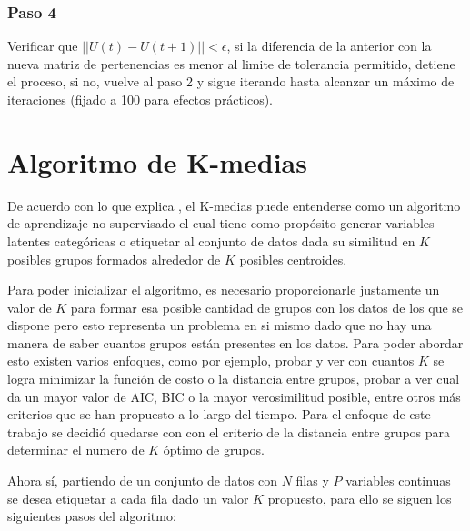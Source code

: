 \documentclass[11pt, letterpaper]{article}
\begin{document}
\subsubsection{Paso 4}

Verificar que $||U(t)-U(t+1)||<\epsilon$, si la diferencia de la anterior con la nueva matriz de pertenencias es menor al limite de tolerancia permitido, detiene el proceso, si no, vuelve al paso 2 y sigue iterando hasta alcanzar un máximo de iteraciones (fijado a 100 para efectos prácticos).

\newpage

\section{Algoritmo de K-medias}


De acuerdo con lo que explica \cite{bishop2006}, el K-medias puede entenderse como un algoritmo de aprendizaje no supervisado el cual tiene como propósito generar variables latentes categóricas o etiquetar al conjunto de datos dada su similitud en $K$ posibles grupos formados alrededor de $K$ posibles centroides.

Para poder inicializar el algoritmo, es necesario proporcionarle justamente un valor de $K$ para formar esa posible cantidad de grupos con los datos de los que se dispone pero esto representa un problema en si mismo dado que no hay una manera de saber cuantos grupos están presentes en los datos. Para poder abordar esto existen varios enfoques, como por ejemplo, probar y ver con cuantos $K$ se logra minimizar la función de costo o la distancia entre grupos, probar a ver cual da un mayor valor de AIC, BIC o la mayor verosimilitud posible, entre otros más criterios que se han propuesto a lo largo del tiempo. Para el enfoque de este trabajo se decidió quedarse con con el criterio de la distancia entre grupos para determinar el numero de $K$ óptimo de grupos.

Ahora sí, partiendo de un conjunto de datos con $N$ filas y $P$ variables continuas se desea etiquetar a cada fila dado un valor $K$ propuesto, para ello se siguen los siguientes pasos del algoritmo:
\end{document}
